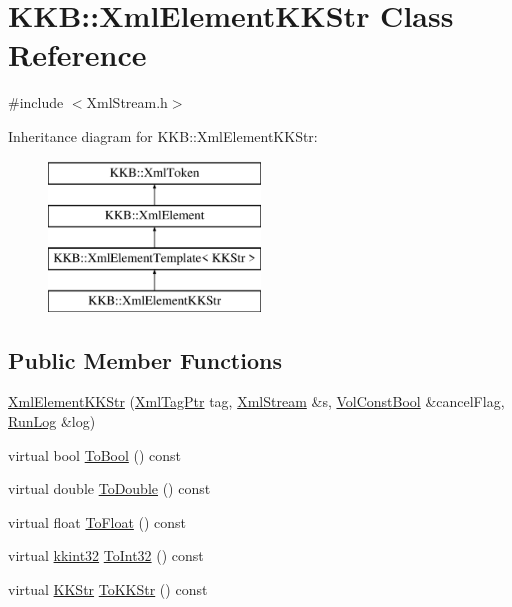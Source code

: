 \hypertarget{class_k_k_b_1_1_xml_element_k_k_str}{}\section{K\+KB\+:\+:Xml\+Element\+K\+K\+Str Class Reference}
\label{class_k_k_b_1_1_xml_element_k_k_str}


{\ttfamily \#include $<$Xml\+Stream.\+h$>$}

Inheritance diagram for K\+KB\+:\+:Xml\+Element\+K\+K\+Str\+:\begin{figure}[H]
\begin{center}
\leavevmode
\includegraphics[height=4.000000cm]{class_k_k_b_1_1_xml_element_k_k_str}
\end{center}
\end{figure}
\subsection*{Public Member Functions}
\begin{DoxyCompactItemize}
\item 
\hyperlink{class_k_k_b_1_1_xml_element_k_k_str_a7b5fc782b322b86f08c45ed4eb49518f}{Xml\+Element\+K\+K\+Str} (\hyperlink{namespace_k_k_b_a9253a3ea8a5da18ca82be4ca2b390ef0}{Xml\+Tag\+Ptr} tag, \hyperlink{class_k_k_b_1_1_xml_stream}{Xml\+Stream} \&s, \hyperlink{namespace_k_k_b_a7d390f568e2831fb76b86b56c87bf92f}{Vol\+Const\+Bool} \&cancel\+Flag, \hyperlink{class_k_k_b_1_1_run_log}{Run\+Log} \&log)
\item 
virtual bool \hyperlink{class_k_k_b_1_1_xml_element_k_k_str_a8ba15eefdf11b1b92b55ff9a6e91a540}{To\+Bool} () const 
\item 
virtual double \hyperlink{class_k_k_b_1_1_xml_element_k_k_str_a27549d20798a9387ebf41ffdf2c86d2e}{To\+Double} () const 
\item 
virtual float \hyperlink{class_k_k_b_1_1_xml_element_k_k_str_ad70580dab90be4e505fd2959ad8eb1e3}{To\+Float} () const 
\item 
virtual \hyperlink{namespace_k_k_b_a8fa4952cc84fda1de4bec1fbdd8d5b1b}{kkint32} \hyperlink{class_k_k_b_1_1_xml_element_k_k_str_a0d99cf6a4d32b10d1ea410a0ae210ab9}{To\+Int32} () const 
\item 
virtual \hyperlink{class_k_k_b_1_1_k_k_str}{K\+K\+Str} \hyperlink{class_k_k_b_1_1_xml_element_k_k_str_a799d1dcb1d656ffceb6a7e809dfd4839}{To\+K\+K\+Str} () const 
\end{DoxyCompactItemize}
